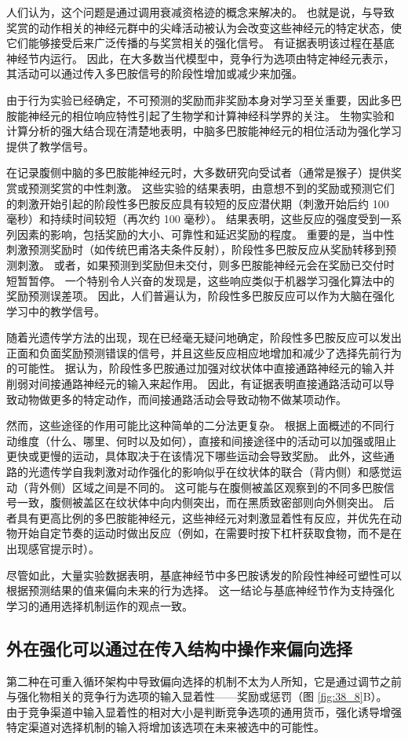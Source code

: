人们认为，这个问题是通过调用衰减资格迹的概念来解决的。 也就是说，与导致奖赏的动作相关的神经元群中的尖峰活动被认为会改变这些神经元的特定状态，使它们能够接受后来广泛传播的与奖赏相关的强化信号。 有证据表明该过程在基底神经节内运行。 因此，在大多数当代模型中，竞争行为选项由特定神经元表示，其活动可以通过传入多巴胺信号的阶段性增加或减少来加强。

由于行为实验已经确定，不可预测的奖励而非奖励本身对学习至关重要，因此多巴胺能神经元的相位响应特性引起了生物学和计算神经科学界的关注。 生物实验和计算分析的强大结合现在清楚地表明，中脑多巴胺能神经元的相位活动为强化学习提供了教学信号。

在记录腹侧中脑的多巴胺能神经元时，大多数研究向受试者（通常是猴子）提供奖赏或预测奖赏的中性刺激。 这些实验的结果表明，由意想不到的奖励或预测它们的刺激开始引起的阶段性多巴胺反应具有较短的反应潜伏期（刺激开始后约 100 毫秒）和持续时间较短（再次约 100 毫秒）。 结果表明，这些反应的强度受到一系列因素的影响，包括奖励的大小、可靠性和延迟奖励的程度。 重要的是，当中性刺激预测奖励时（如传统巴甫洛夫条件反射），阶段性多巴胺反应从奖励转移到预测刺激。 或者，如果预测到奖励但未交付，则多巴胺能神经元会在奖励已交付时短暂暂停。 一个特别令人兴奋的发现是，这些响应类似于机器学习强化算法中的奖励预测误差项。 因此，人们普遍认为，阶段性多巴胺反应可以作为大脑在强化学习中的教学信号。

随着光遗传学方法的出现，现在已经毫无疑问地确定，阶段性多巴胺反应可以发出正面和负面奖励预测错误的信号，并且这些反应相应地增加和减少了选择先前行为的可能性。 据认为，阶段性多巴胺通过加强对纹状体中直接通路神经元的输入并削弱对间接通路神经元的输入来起作用。 因此，有证据表明直接通路活动可以导致动物做更多的特定动作，而间接通路活动会导致动物不做某项动作。

然而，这些途径的作用可能比这种简单的二分法更复杂。 根据上面概述的不同行动维度（什么、哪里、何时以及如何），直接和间接途径中的活动可以加强或阻止更快或更慢的运动，具体取决于在该情况下哪些运动会导致奖励。 此外，这些通路的光遗传学自我刺激对动作强化的影响似乎在纹状体的联合（背内侧）和感觉运动（背外侧）区域之间是不同的。 这可能与在腹侧被盖区观察到的不同多巴胺信号一致，腹侧被盖区在纹状体中向内侧突出，而在黑质致密部则向外侧突出。 后者具有更高比例的多巴胺能神经元，这些神经元对刺激显着性有反应，并优先在动物开始自定节奏的运动时做出反应（例如，在需要时按下杠杆获取食物，而不是在出现感官提示时）。

尽管如此，大量实验数据表明，基底神经节中多巴胺诱发的阶段性神经可塑性可以根据预测结果的值来偏向未来的行为选择。 这一结论与基底神经节作为支持强化学习的通用选择机制运作的观点一致。

\subsection{外在强化可以通过在传入结构中操作来偏向选择}
第二种在可重入循环架构中导致偏向选择的机制不太为人所知，它是通过调节之前与强化物相关的竞争行为选项的输入显着性——奖励或惩罚（图 \ref{fig:38_8}B）。 由于竞争渠道中输入显着性的相对大小是判断竞争选项的通用货币，强化诱导增强特定渠道对选择机制的输入将增加该选项在未来被选中的可能性。

